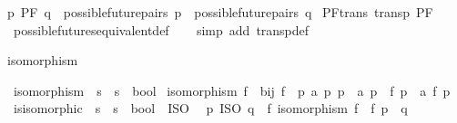 \begin{isabellebody}
{\isacartoucheopen}p\ {\isasymsimeq}PF\ q\ {\isasymequiv}\ {\isacharparenleft}{\kern0pt}possible{\isacharunderscore}{\kern0pt}future{\isacharunderscore}{\kern0pt}pairs\ p\ {\isacharequal}{\kern0pt}\ possible{\isacharunderscore}{\kern0pt}future{\isacharunderscore}{\kern0pt}pairs\ q{\isacharparenright}{\kern0pt}{\isacartoucheclose}\isanewline
\isanewline
{}\isamarkupfalse%
\ PF{\isacharunderscore}{\kern0pt}trans{\isacharcolon}{\kern0pt}\ {\isachardoublequoteopen}transp\ {\isacharparenleft}{\kern0pt}{\isasymsimeq}PF{\isacharparenright}{\kern0pt}{\isachardoublequoteclose}\isanewline
%
\isadelimproof
\ \ %
\endisadelimproof
%
\isatagproof
{}\isamarkupfalse%
\ possible{\isacharunderscore}{\kern0pt}futures{\isacharunderscore}{\kern0pt}equivalent{\isacharunderscore}{\kern0pt}def\isanewline
\ \ \isamarkupfalse%
\ {\isacharparenleft}{\kern0pt}simp\ add{\isacharcolon}{\kern0pt}\ transp{\isacharunderscore}{\kern0pt}def{\isacharparenright}{\kern0pt}%
\endisatagproof
{\isafoldproof}%
%
\isadelimproof
%
\endisadelimproof
%
\begin{isamarkuptext}%
isomorphism%
\end{isamarkuptext}\isamarkuptrue%
\isamarkupfalse%
\ isomorphism\ {\isacharcolon}{\kern0pt}{\isacharcolon}{\kern0pt}\ {\isacartoucheopen}{\isacharparenleft}{\kern0pt}{\isacharprime}{\kern0pt}s\ {\isasymRightarrow}\ {\isacharprime}{\kern0pt}s{\isacharparenright}{\kern0pt}\ {\isasymRightarrow}\ bool{\isacartoucheclose}\ \isanewline
{\isacartoucheopen}isomorphism\ f\ {\isasymequiv}\ bij\ f\ {\isasymand}\ {\isacharparenleft}{\kern0pt}{\isasymforall}p\ a\ p{\isacharprime}{\kern0pt}{\isachardot}{\kern0pt}\ p\ {\isasymmapsto}\ a\ p{\isacharprime}{\kern0pt}\ {\isasymlongleftrightarrow}\ f\ p\ {\isasymmapsto}\ a\ {\isacharparenleft}{\kern0pt}f\ p{\isacharprime}{\kern0pt}{\isacharparenright}{\kern0pt}{\isacharparenright}{\kern0pt}{\isacartoucheclose}\isanewline
\isanewline
{}\isamarkupfalse%
\ is{\isacharunderscore}{\kern0pt}isomorphic\ {\isacharcolon}{\kern0pt}{\isacharcolon}{\kern0pt}\ {\isacartoucheopen}{\isacharprime}{\kern0pt}s\ {\isasymRightarrow}\ {\isacharprime}{\kern0pt}s\ {\isasymRightarrow}\ bool{\isacartoucheclose}\ {\isacharparenleft}{\kern0pt}\ {\isacartoucheopen}{\isasymsimeq}ISO{\isacartoucheclose}\ {}{}{\isacharparenright}{\kern0pt}\ \isanewline
{\isacartoucheopen}p\ {\isasymsimeq}ISO\ q\ {\isasymequiv}\ {\isasymexists}f{\isachardot}{\kern0pt}\ isomorphism\ f\ {\isasymand}\ {\isacharparenleft}{\kern0pt}f\ p{\isacharparenright}{\kern0pt}\ {\isacharequal}{\kern0pt}\ q{\isacartoucheclose}%

\end{isabellebody}
